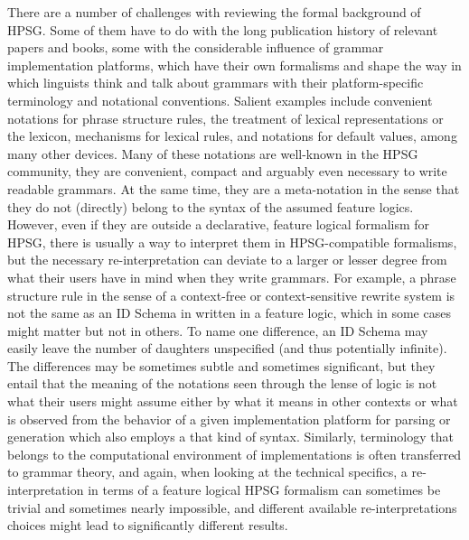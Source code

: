 \documentclass[output=paper
                ,modfonts
                ,nonflat
	        ,collection
	        ,collectionchapter
	        ,collectiontoclongg
 	        ,biblatex
                ,babelshorthands
                ,newtxmath
                ,draftmode
                ,colorlinks, citecolor=brown
]{./langsci/langscibook}
\begin{document}
{There are a number of challenges with reviewing the formal background
of HPSG. Some of them have to do with the long publication history of relevant papers and books, some
with the considerable influence of grammar implementation platforms, which have
their own formalisms and shape the way in which
linguists think and talk about grammars with their platform-specific terminology
and notational conventions. %
Salient examples include convenient
notations for phrase structure rules, the treatment of lexical
representations or the lexicon, mechanisms for lexical rules, and
notations for default values, among many other devices.  Many of these
notations are well-known in the HPSG community, they are convenient,
compact and arguably even necessary to write readable grammars. At
the same time, they are
a meta-notation in the sense that they
do not (directly) belong to the syntax of the assumed feature logics.
However, even if they are outside a declarative, feature logical formalism for HPSG,
there is usually a way to
interpret them in HPSG-compatible formalisms, but the necessary
re-interpretation can deviate to a larger or lesser degree from
what their users have in mind when they write grammars. For example,
a phrase structure rule in the sense of a context-free or context-sensitive
rewrite system is not the same as an ID Schema in written in a feature logic, which in
some cases might matter but not in others. To name one difference,
an ID Schema may easily leave the number of daughters unspecified (and
thus potentially infinite).
The differences may be sometimes subtle and sometimes significant, but
they entail that the meaning of the notations seen through the lense
of logic is not what their users might assume either
by what it means in other contexts or what is observed 
from the behavior
of a given implementation platform for parsing or generation which also
employs a that kind of syntax.
Similarly, terminology that belongs to the computational environment
of implementations is often transferred to grammar theory, and
again, when looking at the technical specifics, a re-interpretation in terms of a feature logical HPSG
formalism can sometimes be trivial and sometimes nearly impossible,
and different available re-interpretations choices might
lead to significantly different results.

}
\end{document}
